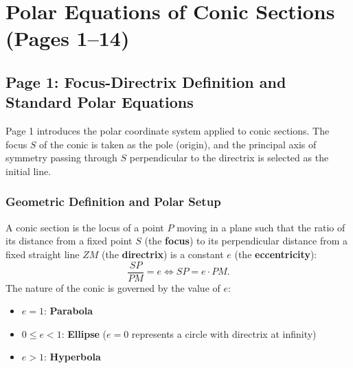 \chapter{Polar Equations of Conic Sections (Pages 1--14)}
\label{ch:polar_conics}

\section{Page 1: Focus-Directrix Definition and Standard Polar Equations}
\label{sec:page01}

\begin{conceptbox}
Page 1 introduces the polar coordinate system applied to conic sections. The focus $S$ of the conic is taken as the pole (origin), and the principal axis of symmetry passing through $S$ perpendicular to the directrix is selected as the initial line.
\end{conceptbox}

\subsection{Geometric Definition and Polar Setup}
A conic section is the locus of a point $P$ moving in a plane such that the ratio of its distance from a fixed point $S$ (the \textbf{focus}) to its perpendicular distance from a fixed straight line $ZM$ (the \textbf{directrix}) is a constant $e$ (the \textbf{eccentricity}):
\begin{equation}
    \frac{SP}{PM} = e \iff SP = e \cdot PM.
\end{equation}
The nature of the conic is governed by the value of $e$:
\begin{itemize}[noitemsep]
    \item $e = 1$: \textbf{Parabola}
    \item $0 \le e < 1$: \textbf{Ellipse} ($e=0$ represents a circle with directrix at infinity)
    \item $e > 1$: \textbf{Hyperbola}
\end{itemize}

